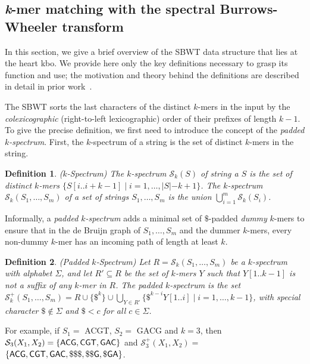 \documentclass[unnumsec,webpdf,contemporary,large]{oup-authoring-template}%
\theoremstyle{thmstyleone}%
\theoremstyle{thmstyletwo}%
\theoremstyle{thmstylethree}%
\newtheorem{definition}{Definition}
\begin{document}
\subsection{\textit{k}-mer matching with the spectral Burrows-Wheeler transform}\label{kmermatching}

In this section, we give a brief overview of the SBWT data structure that lies at the heart {\sf kbo}. We provide here only the key definitions necessary to grasp its function and use; the motivation and theory behind the definitions are described in detail in prior work~\cite{alanko2023small, alanko2023longest, alanko2024finimizers}.

The SBWT sorts the last characters of the distinct $k$-mers in the input by the \emph{colexicographic} (right-to-left lexicographic) order of their prefixes of length $k-1$. To give the precise definition, we first need to introduce the concept of the \emph{padded $k$-spectrum}. First, the $k$-spectrum of a string is the set of distinct $k$-mers in the string.

\begin{definition}($k$-Spectrum) The $k$-spectrum $\mathcal{S}_k(S)$ of string a $S$ is the set of distinct $k$-mers $\{S[i..i+k-1] \; | \; i = 1 , \ldots, |S|-k+1\}$.
%
The $k$-spectrum $\mathcal{S}_k(S_1, \ldots, S_m)$ of a set of strings $S_1, \ldots, S_m$ is the union $\bigcup_{i = 1}^m \mathcal{S}_k(S_i)$.
\end{definition}

\noindent Informally, a \emph{padded $k$-spectrum} adds a minimal set of $\$$-padded \emph{dummy} $k$-mers to ensure that in the de Bruijn graph of $S_1, \ldots, S_m$ and the dummer $k$-mers, every non-dummy $k$-mer has an incoming path of length at least $k$.

\begin{definition}\label{def:padded_k_spectrum} (Padded $k$-Spectrum)
Let $R = \mathcal{S}_k(S_1, \ldots, S_m)$ be a $k$-spectrum with alphabet $\Sigma$, and let $R' \subseteq R$ be the set of $k$-mers $Y$ such that $Y[1..k-1]$ is not a suffix of any $k$-mer in $R$. The padded $k$-spectrum is the set $\mathcal{S}_k^+(S_1, \ldots, S_m) = R \cup \{\$^k\} \cup \bigcup_{Y \in R'} \{\$^{k-i} Y[1..i] \; | \; i = 1, \ldots, k-1\}$, with special character $\$ \not\in \Sigma$ and $\$ < c$ for all $c \in \Sigma$.
\end{definition}
\noindent For example, if $S_1 = $ {\sf ACGT}, $S_2 = $ {\sf GACG} and $k=3$, then $\mathcal{S}_3(X_1, X_2) = \{ {\sf ACG }, {\sf CGT }, {\sf GAC }\}$ and $\mathcal{S}_3^+(X_1, X_2) = $ $\{{\sf ACG }, {\sf CGT}, {\sf GAC }, {\sf \$\$\$}, {\sf \$\$G}, {\sf \$GA} \}$.
\end{document}
